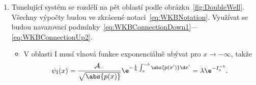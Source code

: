 \begin{solution}
	\begin{enumerate}
	\item
		Tunelující systém se rozdělí na pět oblastí podle obrázku~\ref{fig:DoubleWell}.
		Všechny výpočty budou ve zkrácené notaci~\eqref{eq:WKBNotation}.
		Využívat se budou navazovací podmínky~\eqref{eq:WKBConnectionDown1}---\eqref{eq:WKBConnectionUp2}.
		
		\begin{itemize}
		\item
			V oblasti I musí vlnová funkce exponenciálně ubývat pro $x\rightarrow-\infty$, takže
			\begin{equation}
				\psi_{\mathrm{I}}(x)=\frac{\mathcal{A}_{-}}{\sqrt{\abs{p(x)}}}\e^{-\frac{1}{\hbar}\int_{x}^{-b}\abs{p(x')}\d x'}=\lambda\e^{-I_{x}^{-b}}.
			\end{equation}
			

\end{itemize}
\end{enumerate}
\end{solution}

